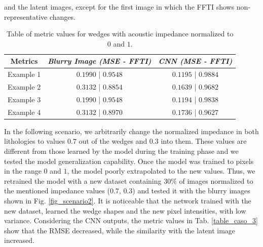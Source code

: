 \documentclass[conference]{IEEEtran}
\begin{document}
and the latent images, except for the first image in which the FFTI shows non-representative changes.
\begin{table}[!t]
\renewcommand{\arraystretch}{1.2}
\caption{Table of metric values for wedges with acoustic impedance normalized to $0$ and $1$.}
\label{table_caso_1}
\centering
\begin{tabular}{|c||c||c|}
\hline
 \textbf{Metrics} & \textbf{\textit{Blurry Image (MSE - FFTI)}} & \textbf{\textit{CNN (MSE - FFTI)}}\\
\hline
Example 1 & $0.1990$ | $0.9548$ & $0.1195$ | $0.9884$\\
\hline
Example 2 & $0.3132$ | $0.8854$ & $0.1639$ | $0.9682$\\
\hline
Example 3 & $0.1990$ | $0.9548$ & $0.1194$ | $0.9838$\\
\hline
Example 4 & $0.3132$ | $0.8970$ & $0.1736$ | $0.9627$\\
\hline
\end{tabular}
\end{table}

In the following scenario, we arbitrarily change the normalized impedance in both
lithologies to values $ 0.7 $ out of the wedges and $ 0.3$ into them.
These values are different from those learned by the model during the
training phase and we tested the model generalization capability. Once the model was trained to pixels in the range
$ 0 $ and $ 1 $, the model poorly extrapolated to the new values. Thus, we retrained the model with a new dataset containing $30\%$
of images normalized to the mentioned impedance values ($0.7$, $0.3$) and tested it with the blurry images shown in Fig. \ref{fig_scenario2}. It is noticeable that the network trained with the new dataset, learned
the wedge shapes and the new pixel intensities, with low variance. Considering the CNN outputs, the metric values in Tab. \ref{table_caso_3}
show that the RMSE decreased, while the similarity with the latent image increased.
\end{document}
